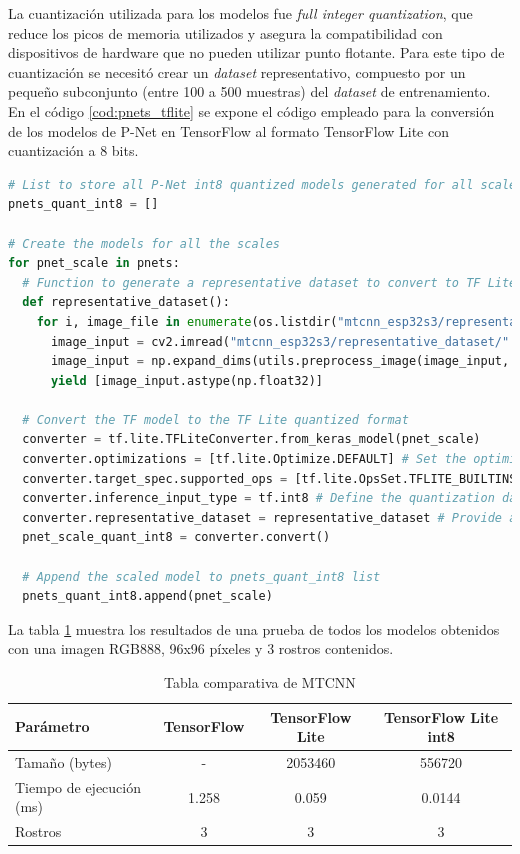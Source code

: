La cuantización utilizada para los modelos fue \textit{full integer quantization}, que reduce los picos de memoria utilizados y asegura la compatibilidad con dispositivos de hardware que no pueden utilizar punto flotante. Para este tipo de cuantización se necesitó crear un \textit{dataset} representativo, compuesto por un pequeño subconjunto (entre 100 a 500 muestras) del \textit{dataset} de entrenamiento. En el código \ref{cod:pnets_tflite} se expone el código empleado para la conversión de los modelos de P-Net en TensorFlow al formato TensorFlow Lite con cuantización a 8 bits.

\begin{lstlisting}[language=Python, label=cod:pnets_tflite, caption=Código para crear los modelos de P-Net con TensorFlow Lite con cuantización de 8 bits.]
# List to store all P-Net int8 quantized models generated for all scales
pnets_quant_int8 = []

# Create the models for all the scales
for pnet_scale in pnets:
  # Function to generate a representative dataset to convert to TF Lite quantized
  def representative_dataset():
    for i, image_file in enumerate(os.listdir("mtcnn_esp32s3/representative_dataset/")):
      image_input = cv2.imread("mtcnn_esp32s3/representative_dataset/" + image_file)
      image_input = np.expand_dims(utils.preprocess_image(image_input, hs, ws, np.float32), axis=0)
      yield [image_input.astype(np.float32)]

  # Convert the TF model to the TF Lite quantized format 
  converter = tf.lite.TFLiteConverter.from_keras_model(pnet_scale)
  converter.optimizations = [tf.lite.Optimize.DEFAULT] # Set the optimization flag
  converter.target_spec.supported_ops = [tf.lite.OpsSet.TFLITE_BUILTINS_INT8] # Enforce integer only quantization
  converter.inference_input_type = tf.int8 # Define the quantization data type
  converter.representative_dataset = representative_dataset # Provide a representative dataset to ensure we quantize correctly.
  pnet_scale_quant_int8 = converter.convert()

  # Append the scaled model to pnets_quant_int8 list
  pnets_quant_int8.append(pnet_scale)
\end{lstlisting}

La tabla \ref{tab:models_comp} muestra los resultados de una prueba de todos los modelos obtenidos con una imagen RGB888, 96x96 píxeles y 3 rostros contenidos.

\begin{table}[h]
	\centering
	\caption[Modelos comparativa]{Tabla comparativa de MTCNN}
	\begin{tabular}{lccc}   
		\toprule
		\textbf{Parámetro} & \textbf{TensorFlow} & \textbf{TensorFlow Lite} & \textbf{TensorFlow Lite int8} \\
		\midrule
		Tamaño (bytes) & - & 2053460 &  556720 \\
		Tiempo de ejecución (ms) & 1.258 & 0.059 & 0.0144 \\
		Rostros & 3 & 3 & 3 \\
		\bottomrule
		\hline
	\end{tabular}
	\label{tab:models_comp}
\end{table}

